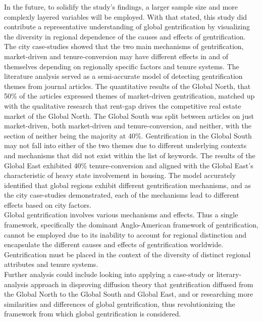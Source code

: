 \documentclass[12pt]{article}
\begin{document}
In the future, to solidify the study’s findings, a larger sample size and more complexly layered variables will be employed. With that stated, this study did contribute a representative understanding of global gentrification by visualizing the diversity in regional dependence of the causes and effects of gentrification. \\
	
The city case-studies showed that the two main mechanisms of gentrification, market-driven and tenure-conversion may have different effects in and of themselves depending on regionally specific factors and tenure systems. The literature analysis served as a semi-accurate model of detecting gentrification themes from journal articles. The quantitative results of the Global North, that 50\% of the articles expressed themes of market-driven gentrification, matched up with the qualitative research that rent-gap drives the competitive real estate market of the Global North. The Global South was split between articles on just market-driven, both market-driven and tenure-conversion, and neither, with the section of neither being the majority at 40\%. Gentrification in the Global South may not fall into either of the two themes due to different underlying contexts and mechanisms that did not exist within the list of keywords. The results of the Global East exhibited 40\% tenure-conversion and aligned with the Global East’s characteristic of heavy state involvement in housing. The model accurately identified that global regions exhibit different gentrification mechanisms, and as the city case-studies demonstrated, each of the mechanisms lead to different effects based on city factors. \\

Global gentrification involves various mechanisms and effects. Thus a single framework, specifically the dominant Anglo-American framework of gentrification, cannot be employed due to its inability to account for regional distinction and encapsulate the different causes and effects of gentrification worldwide. Gentrification must be placed in the context of the diversity of distinct regional attributes and tenure systems. \\

Further analysis could include looking into applying a case-study or literary-analysis approach in disproving diffusion theory that gentrification diffused from the Global North to the Global South and Global East, and or researching more similarities and differences of global gentrification, thus revolutionizing the framework from which global gentrification is considered. \\
\end{document}

